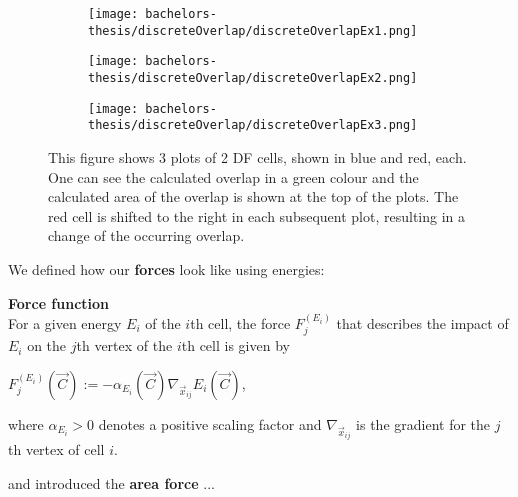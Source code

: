 \begin{figure}[h!]
	\centering
	\begin{subfigure}{0.3\textwidth}
		\texttt{[image: bachelors-thesis/discreteOverlap/discreteOverlapEx1.png]}
	\end{subfigure}
	\hfill
	\begin{subfigure}{0.3\textwidth}
		\texttt{[image: bachelors-thesis/discreteOverlap/discreteOverlapEx2.png]}
	\end{subfigure}
	\hfill
	\begin{subfigure}{0.3\textwidth}
		\texttt{[image: bachelors-thesis/discreteOverlap/discreteOverlapEx3.png]}
	\end{subfigure}\hfill
	\caption{This figure shows 3 plots of 2 DF cells, shown in blue and red, each. One can see the calculated overlap in a green colour and the calculated area of the overlap is shown at the top of the plots. The red cell is shifted to the right in each subsequent plot, resulting in a change of the occurring overlap.}
	\label{fig:finalDiscreteOverlap}
\end{figure}

\newpage 
We defined how our \textbf{forces} look like using energies: 

\begin{definition} \textbf{Force function} \label{def:forceFunction}\\
	For a given energy $E_i$ of the $i$th cell, the force $F_{j}^{(E_i)}$ that describes the impact of $E_i$ on the $j$th vertex of the $i$th cell is given by
	\begin{center}
		$F_{j}^{(E_i)}(\vec{C}) := -\alpha_{E_i}(\vec{C}) \nabla_{\vec{x}_{ij}} E_i(\vec{C})$,
	\end{center}
	where $\alpha_{E_i} > 0$ denotes a positive scaling factor and $\nabla_{\vec{x}_{ij}}$ is the gradient for the $j$th vertex of cell $i$. 	\\
\end{definition}

and introduced the \textbf{area force} ...

